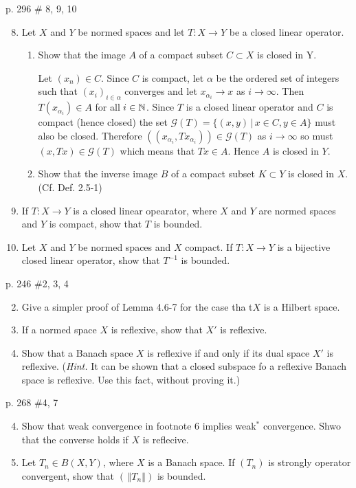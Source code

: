 \documentclass[10pt,a4paper]{report}
\newcommand{\NORM}[1]{\,\left \Vert #1 \right \Vert}
\begin{document}
\newpage p. 296 \# 8, 9, 10 
\begin{enumerate}
	\setcounter{enumi}{7}
	\item Let $X$ and $Y$ be normed spaces and let $T: X \to Y$ be a closed linear operator.  
	\begin{enumerate}
		\item Show that the image $A$ of a compact subset $C \subset X$ is closed in Y.

		Let $(x_n) \in C$.  Since $C$ is compact, let $\alpha$ be the ordered set of integers such that $(x_i)_{i\in \alpha}$ converges and let $x_{\alpha_i} \to x$ as $i \to \infty$.  Then $T(x_{\alpha_i}) \in A$ for all $i \in \mathbb{N}$.  Since $T$ is a closed linear operator and $C$ is compact (hence closed) the set $\mathcal{G}(T)=\{ (x,y) \,|\, x \in C, y \in A\}$ must also be closed.  Therefore $((x_{\alpha_i}, Tx_{\alpha_i}))\in\mathcal{G}(T)$ as $i \to \infty$ so must $(x, Tx) \in \mathcal{G}(T)$ which means that $Tx \in A$.  Hence $A$ is closed in $Y$. 
		
		\item Show that the inverse image $B$ of a compact subset $K \subset Y$ is closed in $X$.  (Cf. Def. 2.5-1)
		
		
		
	\end{enumerate}
	
	\item If $T: X \to Y$ is a closed linear opearator, where $X$ and $Y$ are normed spaces and $Y$ is compact, show that $T$ is bounded.
	
	\item Let $X$ and $Y$ be normed spaces and $X$ compact.  If $T: X \to Y$ is a bijective closed linear operator, show that $T^{-1}$ is bounded.

\end{enumerate}
\newpage p. 246 \#2, 3, 4 
\begin{enumerate}
	\setcounter{enumi}{1}
	\item Give a simpler proof of Lemma 4.6-7 for the case tha t$X$ is a Hilbert space.
	\item If a normed space $X$ is reflexive, show that $X'$ is reflexive.
	\item Show that a Banach space $X$ is reflexive if and only if its dual space $X'$ is reflexive.  (\textit{Hint.}  It can be shown that a closed subspace fo a reflexive Banach space is reflexive.  Use this fact, without proving it.)
\end{enumerate}

\newpage p. 268 \#4, 7
\begin{enumerate}
	\setcounter{enumi}{3}
	\item Show that weak convergence in footnote 6 implies weak$^*$ convergence.  Shwo that the converse holds if $X$ is reflecive.
	\setcounter{enumi}{6}
	\item Let $T_n \in B(X,Y)$, where $X$ is a Banach space.  If $(T_n)$ is strongly operator convergent, show that $(\NORM{T_n})$ is bounded.

\end{enumerate}
\end{document}
